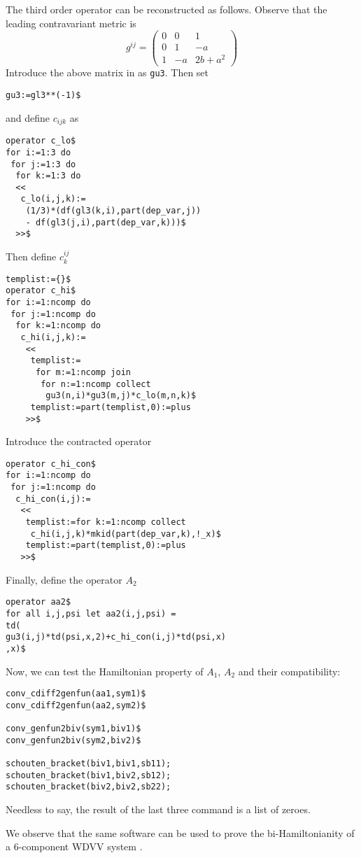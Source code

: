 The third order operator can be reconstructed as follows.
Observe that the leading contravariant metric is
\[
  g^{ij}=
  \begin{pmatrix}
    0 & 0 & 1
    \\
    0 & 1 & -a
    \\
    1 & -a & 2b+a^2
  \end{pmatrix}
\]
Introduce the above matrix in \REDUCE as \texttt{gu3}. Then set
\begin{verbatim}
gu3:=gl3**(-1)$
\end{verbatim}
and define $c_{ijk}$ as
\begin{verbatim}
operator c_lo$
for i:=1:3 do
 for j:=1:3 do
  for k:=1:3 do
  <<
   c_lo(i,j,k):=
    (1/3)*(df(gl3(k,i),part(dep_var,j))
    - df(gl3(j,i),part(dep_var,k)))$
  >>$
\end{verbatim}
Then define $c^{ij}_k$
\begin{verbatim}
templist:={}$
operator c_hi$
for i:=1:ncomp do
 for j:=1:ncomp do
  for k:=1:ncomp do
   c_hi(i,j,k):=
    <<
     templist:=
      for m:=1:ncomp join
       for n:=1:ncomp collect
        gu3(n,i)*gu3(m,j)*c_lo(m,n,k)$
     templist:=part(templist,0):=plus
    >>$
\end{verbatim}
Introduce the contracted operator
\begin{verbatim}
operator c_hi_con$
for i:=1:ncomp do
 for j:=1:ncomp do
  c_hi_con(i,j):=
   <<
    templist:=for k:=1:ncomp collect
     c_hi(i,j,k)*mkid(part(dep_var,k),!_x)$
    templist:=part(templist,0):=plus
   >>$
\end{verbatim}
Finally, define the operator $A_2$
\begin{verbatim}
operator aa2$
for all i,j,psi let aa2(i,j,psi) =
td(
gu3(i,j)*td(psi,x,2)+c_hi_con(i,j)*td(psi,x)
,x)$
\end{verbatim}
Now, we can test the Hamiltonian property of $A_1$, $A_2$ and their
compatibility:
\begin{verbatim}
conv_cdiff2genfun(aa1,sym1)$
conv_cdiff2genfun(aa2,sym2)$

conv_genfun2biv(sym1,biv1)$
conv_genfun2biv(sym2,biv2)$

schouten_bracket(biv1,biv1,sb11);
schouten_bracket(biv1,biv2,sb12);
schouten_bracket(biv2,biv2,sb22);
\end{verbatim}
Needless to say, the result of the last three command is a list of zeroes.

We observe that the same software can be used to prove the bi-Hamiltonianity of
a $6$-component WDVV system \cite{PavlovVitolo:2015}.

